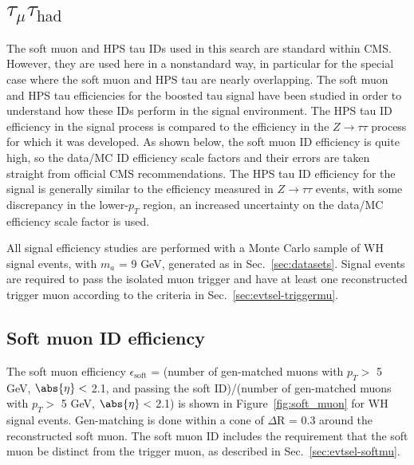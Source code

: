 \section{$\tau_{\mu}\tau_{\text{had}}$\label{lepid-eff-muPlusX}}

The soft muon and HPS tau IDs used in this search are standard within CMS.  However, they are used here in a nonstandard way, in particular for the special case where the soft muon and HPS tau are nearly overlapping. %
The soft muon and HPS tau efficiencies for the boosted tau signal have been studied in order to understand how these IDs perform in the signal environment. The HPS tau ID efficiency in the signal process is compared to the efficiency in the $Z\rightarrow\tau\tau$ process for which it was developed.  As shown below, the soft muon ID efficiency is quite high, so the data/MC ID efficiency scale factors and their errors are taken straight from official CMS recommendations. The HPS tau ID efficiency for the signal is generally similar to the efficiency measured in $Z\rightarrow\tau\tau$ events, with some discrepancy in the lower-$p_T$ region, an increased uncertainty on the data/MC efficiency scale factor is used.

All signal efficiency studies are performed with a Monte Carlo sample of WH signal events, with $m_{a}$ = 9 GeV, generated as in Sec.~\ref{sec:datasets}.  Signal events are required to pass the isolated muon trigger and have at least one reconstructed trigger muon according to the criteria in Sec.~\ref{sec:evtsel-triggermu}.

\subsection{Soft muon ID efficiency\label{sec:soft-mu-id}}

The soft muon efficiency $\epsilon_{\text{soft}}$ = (number of gen-matched muons with $p_T >$ 5 GeV, $\abs{\eta} <$ 2.1, and passing the soft ID)/(number of gen-matched muons with $p_T >$ 5 GeV, $\abs{\eta} <$ 2.1) is shown in Figure~\ref{fig:soft_muon} for WH signal events.  Gen-matching is done within a cone of $\Delta$R = 0.3 around the reconstructed soft muon.  The soft muon ID includes the requirement that the soft muon be distinct from the trigger muon, as described in Sec.~\ref{sec:evtsel-softmu}.

